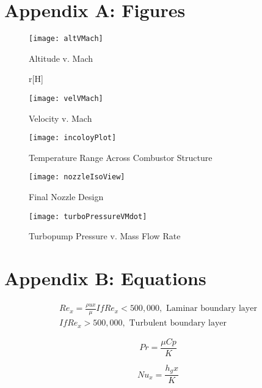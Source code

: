 \section{Appendix A: Figures}

\begin{figure}[H]
\begin{center}
\texttt{[image: altVMach]}
\caption{Altitude v. Mach}
\label{fig:altVMach}
\end{center}
\end{figure}

\begin{figure}{r}[H]
\begin{center}
\texttt{[image: velVMach]}
\caption{Velocity v. Mach}
\label{fig:velVMach}
\end{center}
\end{figure}

\begin{figure}[H]
\begin{center}
\texttt{[image: incoloyPlot]}
\caption{Temperature Range Across Combustor Structure \cite{inco}}
\label{fig:incoloyPlot}
\end{center}
\end{figure}

\begin{figure}[H]
\begin{center}
\texttt{[image: nozzleIsoView]}
\caption{Final Nozzle Design}
\label{fig:nozzleIsoView}
\end{center}
\end{figure}

\begin{figure}[H]
\begin{center}
\texttt{[image: turboPressureVMdot]}
\caption{Turbopump Pressure v. Mass Flow Rate}
\label{fig:turboPressureVMdot}
\end{center}
\end{figure}


\section{Appendix B: Equations}

\begin{equation}
\begin{split}
Re_x=\frac{\rho u x}{\mu}	
If   Re_x<500,000, \text{  Laminar boundary layer} \\
	If   Re_x>500,000, \text{  Turbulent boundary layer}
\end{split}
\label{eqn:reynolds}
\end{equation}


\begin{equation}
Pr=\frac{\mu Cp}{K}
\label{eqn:prandtl}
\end{equation}

\begin{equation}
Nu_x=\frac{h_g x}{K}
\label{eqn:nusselt}
\end{equation}